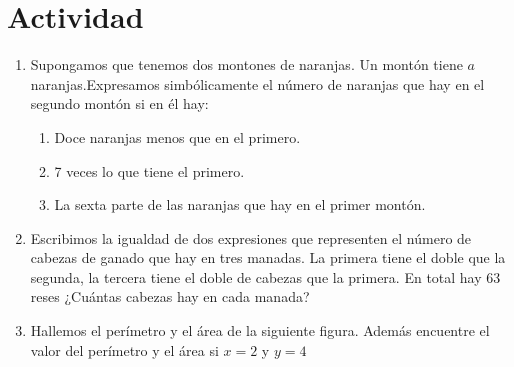 \documentclass[10pt,twoside]{article}
\begin{document}
\section{Actividad}
\begin{enumerate}
  \item Supongamos que tenemos dos montones de naranjas. Un montón tiene $a$ naranjas.Expresamos simbólicamente el número de naranjas que hay en el segundo montón si en él hay:
\begin{enumerate}
  \item Doce naranjas menos que en el primero.
  \item 7 veces lo que tiene el primero.
  \item La sexta parte de las naranjas que hay en el primer montón.
\end{enumerate}
  \item Escribimos la igualdad de dos expresiones que representen el número de cabezas de ganado que hay en tres manadas. La primera tiene el doble que la segunda, la tercera tiene el doble de cabezas que la primera. En total hay 63 reses ¿Cuántas cabezas hay en cada manada?
\item Hallemos el perímetro y el área de la siguiente figura. Además encuentre el valor del perímetro y el área si $ x=2 $ y $ y=4 $

\end{enumerate}
\end{document}
